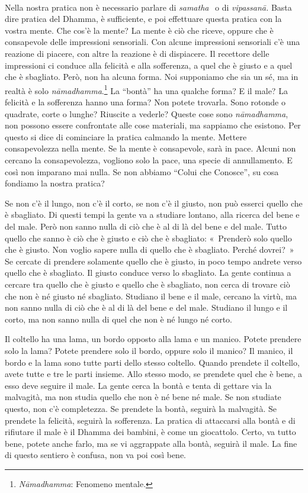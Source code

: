 Nella nostra pratica non è necessario parlare di
\emph{samatha}\textsuperscript{~} o di \emph{vipassanā.} Basta dire
pratica del Dhamma, è sufficiente, e poi effettuare questa pratica con
la vostra mente. Che cos'è la mente? La mente è ciò che riceve, oppure
che è consapevole delle impressioni sensoriali. Con alcune impressioni
sensoriali c'è una reazione di piacere, con altre la reazione è di
dispiacere. Il recettore delle impressioni ci conduce alla felicità e
alla sofferenza, a quel che è giusto e a quel che è sbagliato. Però, non
ha alcuna forma. Noi supponiamo che sia un sé, ma in realtà è solo
\emph{nāmadhamma}.\footnote{\emph{Nāmadhamma}: Fenomeno mentale.} La
``bontà'' ha una qualche forma? E il male? La felicità e la sofferenza
hanno una forma? Non potete trovarla. Sono rotonde o quadrate, corte o
lunghe? Riuscite a vederle? Queste cose sono \emph{nāmadhamma}, non
possono essere confrontate alle cose materiali, ma sappiamo che
esistono. Per questo si dice di cominciare la pratica calmando la mente.
Mettere consapevolezza nella mente. Se la mente è consapevole, sarà in
pace. Alcuni non cercano la consapevolezza, vogliono solo la pace, una
specie di annullamento. E così non imparano mai nulla. Se non abbiamo
``Colui che Conosce'', su cosa fondiamo la nostra pratica?

Se non c'è il lungo, non c'è il corto, se non c'è il giusto, non può
esserci quello che è sbagliato. Di questi tempi la gente va a studiare
lontano, alla ricerca del bene e del male. Però non sanno nulla di ciò
che è al di là del bene e del male. Tutto quello che sanno è ciò che è
giusto e ciò che è sbagliato: «~Prenderò solo quello che è giusto. Non
voglio sapere nulla di quello che è sbagliato. Perché dovrei?~» Se
cercate di prendere solamente quello che è giusto, in poco tempo andrete
verso quello che è sbagliato. Il giusto conduce verso lo sbagliato. La
gente continua a cercare tra quello che è giusto e quello che è
sbagliato, non cerca di trovare ciò che non è né giusto né sbagliato.
Studiano il bene e il male, cercano la virtù, ma non sanno nulla di ciò
che è al di là del bene e del male. Studiano il lungo e il corto, ma non
sanno nulla di quel che non è né lungo né corto.

Il coltello ha una lama, un bordo opposto alla lama e un manico. Potete
prendere solo la lama? Potete prendere solo il bordo, oppure solo il
manico? Il manico, il bordo e la lama sono tutte parti dello stesso
coltello. Quando prendete il coltello, avete tutte e tre le parti
insieme. Allo stesso modo, se prendete quel che è bene, a esso deve
seguire il male. La gente cerca la bontà e tenta di gettare via la
malvagità, ma non studia quello che non è né bene né male. Se non
studiate questo, non c'è completezza. Se prendete la bontà, seguirà la
malvagità. Se prendete la felicità, seguirà la sofferenza. La pratica di
attaccarsi alla bontà e di rifiutare il male è il Dhamma dei bambini, è
come un giocattolo. Certo, va tutto bene, potete anche farlo, ma se vi
aggrappate alla bontà, seguirà il male. La fine di questo sentiero è
confusa, non va poi così bene.

